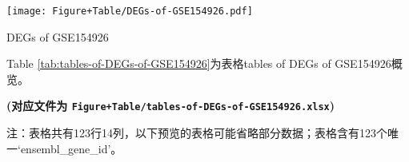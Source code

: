 \documentclass[
]{article}
\begin{document}
\def\@captype{figure}
\begin{center}
\texttt{[image: Figure+Table/DEGs-of-GSE154926.pdf]}
\caption{DEGs of GSE154926}\label{fig:DEGs-of-GSE154926}
\end{center}

Table \ref{tab:tables-of-DEGs-of-GSE154926}为表格tables of DEGs of GSE154926概览。

\textbf{(对应文件为 \texttt{Figure+Table/tables-of-DEGs-of-GSE154926.xlsx})}

\begin{center}\begin{tcolorbox}[colback=gray!10, colframe=gray!50, width=0.9\linewidth, arc=1mm, boxrule=0.5pt]注：表格共有123行14列，以下预览的表格可能省略部分数据；表格含有123个唯一`ensembl\_gene\_id'。
\end{tcolorbox}
\end{center}
\end{document}
